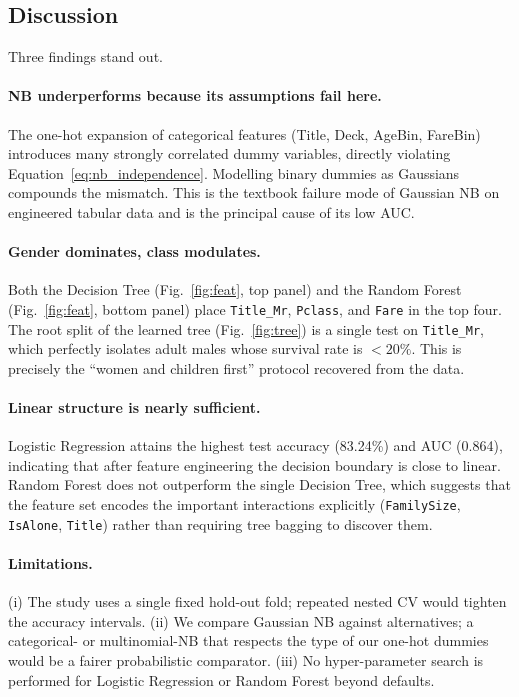 \documentclass[10pt,a4paper,twocolumn]{article}
\begin{document}
\subsection{Discussion}
Three findings stand out.

\paragraph{NB underperforms because its assumptions fail here.} The one-hot expansion of
categorical features (Title, Deck, AgeBin, FareBin) introduces many strongly correlated
dummy variables, directly violating Equation~\eqref{eq:nb_independence}. Modelling binary
dummies as Gaussians compounds the mismatch. This is the textbook failure mode of
Gaussian NB on engineered tabular data and is the principal cause of its low AUC.

\paragraph{Gender dominates, class modulates.} Both the Decision Tree
(Fig.~\ref{fig:feat}, top panel) and the Random Forest (Fig.~\ref{fig:feat}, bottom
panel) place \texttt{Title\_Mr}, \texttt{Pclass}, and \texttt{Fare} in the top four. The root split of
the learned tree (Fig.~\ref{fig:tree}) is a single test on \texttt{Title\_Mr}, which
perfectly isolates adult males whose survival rate is $<20\%$. This is precisely the
``women and children first'' protocol recovered from the data.

\paragraph{Linear structure is nearly sufficient.} Logistic Regression attains the highest
test accuracy (83.24\%) and AUC (0.864), indicating that after feature engineering the
decision boundary is close to linear. Random Forest does not outperform the single
Decision Tree, which suggests that the feature set encodes the important interactions
explicitly (\texttt{FamilySize}, \texttt{IsAlone}, \texttt{Title}) rather than requiring
tree bagging to discover them.

\paragraph{Limitations.} (i) The study uses a single fixed hold-out fold; repeated
nested CV would tighten the accuracy intervals. (ii) We compare Gaussian NB against
alternatives; a categorical- or multinomial-NB that respects the type of our one-hot
dummies would be a fairer probabilistic comparator. (iii) No hyper-parameter search is
performed for Logistic Regression or Random Forest beyond defaults.
\end{document}
